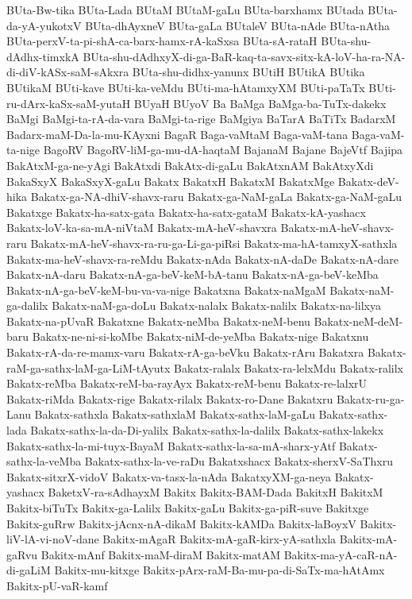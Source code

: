 {BUta-Bw-tika
BUta-Lada
BUtaM
BUtaM-gaLu
BUta-barxhamx
BUtada
BUta-da-yA-yukotxV
BUta-dhAyxneV
BUta-gaLa
BUtaleV
BUta-nAde
BUta-nAtha
BUta-perxV-ta-pi-shA-ca-barx-hamx-rA-kaSxsa
BUta-sA-rataH
BUta-shu-dAdhx-timxkA
BUta-shu-dAdhxyX-di-ga-BaR-kaq-ta-savx-sitx-kA-loV-ha-ra-NA-di-diV-kASx-saM-sAkxra
BUta-shu-didhx-yanunx
BUtiH
BUtikA
BUtika
BUtikaM
BUti-kave
BUti-ka-veMdu
BUti-ma-hAtamxyXM
BUti-paTaTx
BUti-ru-dArx-kaSx-saM-yutaH
BUyaH
BUyoV
Ba
BaMga
BaMga-ba-TuTx-dakekx
BaMgi
BaMgi-ta-rA-da-vara
BaMgi-ta-rige
BaMgiya
BaTarA
BaTiTx
BadarxM
Badarx-maM-Da-la-mu-KAyxni
BagaR
Baga-vaMtaM
Baga-vaM-tana
Baga-vaM-ta-nige
BagoRV
BagoRV-liM-ga-mu-dA-haqtaM
BajanaM
Bajane
BajeVtf
Bajipa
BakAtxM-ga-ne-yAgi
BakAtxdi
BakAtx-di-gaLu
BakAtxnAM
BakAtxyXdi
BakaSxyX
BakaSxyX-gaLu
Bakatx
BakatxH
BakatxM
BakatxMge
Bakatx-deV-hika
Bakatx-ga-NA-dhiV-shavx-raru
Bakatx-ga-NaM-gaLa
Bakatx-ga-NaM-gaLu
Bakatxge
Bakatx-ha-satx-gata
Bakatx-ha-satx-gataM
Bakatx-kA-yashacx
Bakatx-loV-ka-sa-mA-niVtaM
Bakatx-mA-heV-shavxra
Bakatx-mA-heV-shavx-raru
Bakatx-mA-heV-shavx-ra-ru-ga-Li-ga-piRsi
Bakatx-ma-hA-tamxyX-sathxla
Bakatx-ma-heV-shavx-ra-reMdu
Bakatx-nAda
Bakatx-nA-daDe
Bakatx-nA-dare
Bakatx-nA-daru
Bakatx-nA-ga-beV-keM-bA-tanu
Bakatx-nA-ga-beV-keMba
Bakatx-nA-ga-beV-keM-bu-va-va-nige
Bakatxna
Bakatx-naMgaM
Bakatx-naM-ga-dalilx
Bakatx-naM-ga-doLu
Bakatx-nalalx
Bakatx-nalilx
Bakatx-na-lilxya
Bakatx-na-pUvaR
Bakatxne
Bakatx-neMba
Bakatx-neM-benu
Bakatx-neM-deM-baru
Bakatx-ne-ni-si-koMbe
Bakatx-niM-de-yeMba
Bakatx-nige
Bakatxnu
Bakatx-rA-da-re-mamx-varu
Bakatx-rA-ga-beVku
Bakatx-rAru
Bakatxra
Bakatx-raM-ga-sathx-laM-ga-LiM-tAyutx
Bakatx-ralalx
Bakatx-ra-lelxMdu
Bakatx-ralilx
Bakatx-reMba
Bakatx-reM-ba-rayAyx
Bakatx-reM-benu
Bakatx-re-lalxrU
Bakatx-riMda
Bakatx-rige
Bakatx-rilalx
Bakatx-ro-Dane
Bakatxru
Bakatx-ru-ga-Lanu
Bakatx-sathxla
Bakatx-sathxlaM
Bakatx-sathx-laM-gaLu
Bakatx-sathx-lada
Bakatx-sathx-la-da-Di-yalilx
Bakatx-sathx-la-dalilx
Bakatx-sathx-lakekx
Bakatx-sathx-la-mi-tuyx-BayaM
Bakatx-sathx-la-sa-mA-sharx-yAtf
Bakatx-sathx-la-veMba
Bakatx-sathx-la-ve-raDu
Bakatxshacx
Bakatx-sherxV-SaThxru
Bakatx-sitxrX-vidoV
Bakatx-va-tasx-la-nAda
BakatxyXM-ga-neya
Bakatx-yashacx
BaketxV-ra-sAdhayxM
Bakitx
Bakitx-BAM-Dada
BakitxH
BakitxM
Bakitx-biTuTx
Bakitx-ga-Lalilx
Bakitx-gaLu
Bakitx-ga-piR-suve
Bakitxge
Bakitx-guRrw
Bakitx-jAcnx-nA-dikaM
Bakitx-kAMDa
Bakitx-laBoyxV
Bakitx-liV-lA-vi-noV-dane
Bakitx-mAgaR
Bakitx-mA-gaR-kirx-yA-sathxla
Bakitx-mA-gaRvu
Bakitx-mAnf
Bakitx-maM-diraM
Bakitx-matAM
Bakitx-ma-yA-caR-nA-di-gaLiM
Bakitx-mu-kitxge
Bakitx-pArx-raM-Ba-mu-pa-di-SaTx-ma-hAtAmx
Bakitx-pU-vaR-kamf
}
